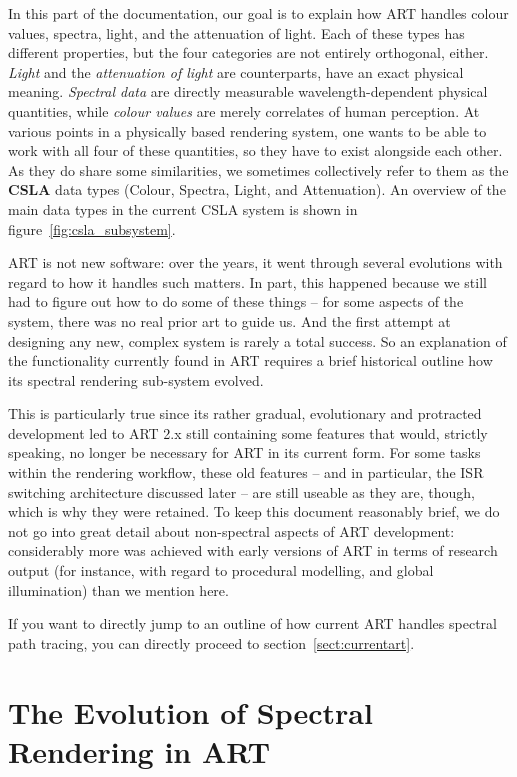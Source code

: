 In this part of the documentation, our goal is to explain how ART handles colour values, spectra, light, and the attenuation of light. Each of these types has different properties, but the four categories are not entirely orthogonal, either. \emph{Light} and the \emph{attenuation of light} are counterparts, have an exact physical meaning. \emph{Spectral data} are directly measurable wavelength-dependent physical quantities, while \emph{colour values} are merely correlates of human perception. At various points in a physically based rendering system, one wants to be able to work with all four of these quantities, so they have to exist alongside each other. As they do share some similarities, we sometimes collectively refer to them as the \textbf{CSLA} data types (Colour, Spectra, Light, and Attenuation). An overview of the main data types in the current CSLA system is shown in figure~\ref{fig:csla_subsystem}.

ART is not new software: over the years, it went through several evolutions with regard to how it handles such matters. In part, this happened because we still had to figure out how to do some of these things -- for some aspects of the system, there was no real prior art to guide us. And the first attempt at designing any new, complex system is rarely a total success. So an explanation of the  functionality currently found in ART requires a brief historical outline how its spectral rendering sub-system evolved.

This is particularly true since its rather gradual, evolutionary and protracted development led to ART 2.x still containing some features that would, strictly speaking, no longer be necessary for ART in its current form. For some tasks within the rendering workflow, these old features -- and in particular, the ISR switching architecture discussed later -- are still useable as they are, though, which is why they were retained. To keep this document reasonably brief, we do not go into great detail about non-spectral aspects of ART development: considerably more was achieved with early versions of ART in terms of research output (for instance, with regard to procedural modelling, and global illumination) than we mention here. 

If you want to directly jump to an outline of how current ART handles spectral path tracing, you can directly proceed to section~\ref{sect:currentart}.

\chapter{The Evolution of Spectral Rendering in ART}
\label{sect:arthistory}
